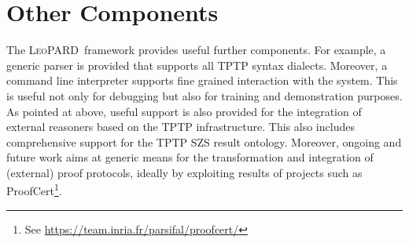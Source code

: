 \documentclass{llncs}
\def\sys{\mbox{\textsc{LeoPARD}}}
\def\leoa{\mbox{\textsc{LEO-I}}}
\def\leob{\mbox{\textsc{LEO-II}}}
\def\leoc{\mbox{\textsc{Leo-III}}}
\begin{document}
\section{Other Components}
The \sys\ framework provides useful further components. For example, a
generic parser is provided that supports all TPTP syntax
dialects. Moreover, a command line interpreter supports fine grained
interaction with the system. This is useful not only for debugging but
also for training and demonstration purposes.  As pointed at above,
useful support is also provided for the integration of external
reasoners based on the TPTP infrastructure. This also includes
comprehensive support for the TPTP SZS result ontology. Moreover,
ongoing and future work aims at generic means for the transformation
and integration of (external) proof protocols, ideally by exploiting
results of projects such as ProofCert\footnote{See
  \url{https://team.inria.fr/parsifal/proofcert/}}.



\end{document}
